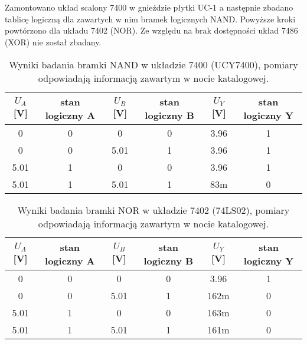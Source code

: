 \section{}
Zamontowano układ scalony 7400 w gnieździe płytki UC-1 a następnie zbadano tablicę logiczną dla zawartych w nim bramek logicznych NAND.
Powyższe kroki powtórzono dla układu 7402 (NOR).
Ze względu na brak dostępności układ 7486 (XOR) nie został zbadany.

\begin{table}[H]
    \centering
    \begin{tabular}{c c | c c || c c}
        \hline
        \(U_A\)[V] & stan logiczny A & \(U_B\)[V] & stan logiczny B & \(U_Y\)[V] & stan logiczny Y
        \\ \hline\hline
        0          & 0               & 0          & 0               & 3.96       & 1               \\ \hline
        0          & 0               & 5.01       & 1               & 3.96       & 1               \\ \hline
        5.01       & 1               & 0          & 0               & 3.96       & 1               \\ \hline
        5.01       & 1               & 5.01       & 1               & 83m        & 0               \\ \hline
    \end{tabular}
    \caption{Wyniki badania bramki NAND w układzie 7400 (UCY7400), pomiary odpowiadają informacją zawartym w nocie katalogowej.}
\end{table}

\begin{table}[H]
    \centering
    \begin{tabular}{c c | c c || c c}
        \hline
        \(U_A\)[V] & stan logiczny A & \(U_B\)[V] & stan logiczny B & \(U_Y\)[V] & stan logiczny Y
        \\ \hline\hline
        0          & 0               & 0          & 0               & 3.96       & 1               \\ \hline
        0          & 0               & 5.01       & 1               & 162m       & 0               \\ \hline
        5.01       & 1               & 0          & 0               & 163m       & 0               \\ \hline
        5.01       & 1               & 5.01       & 1               & 161m       & 0               \\ \hline
    \end{tabular}
    \caption{Wyniki badania bramki NOR w układzie 7402 (74LS02), pomiary odpowiadają informacją zawartym w nocie katalogowej.}
\end{table}
